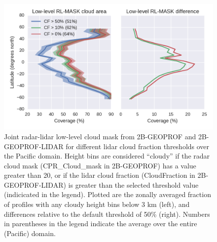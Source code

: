 \begin{figure}[htbp]
\centering
\includegraphics{graphics/misr_rlmask_test.pdf}
\caption{\label{fig:misr_rlmask_test}Joint radar-lidar low-level cloud
mask from 2B-GEOPROF and 2B-GEOPROF-LIDAR for different lidar cloud
fraction thresholds over the Pacific domain. Height bins are considered
``cloudy'' if the radar cloud mask (CPR\_Cloud\_mask in 2B-GEOPROF) has
a value greater than 20, or if the lidar cloud fraction (CloudFraction
in 2B-GEOPROF-LIDAR) is greater than the selected threshold value
(indicicated in the legend). Plotted are the zonally averaged fraction
of profiles with any cloudy height bins below 3 km (left), and
differences relative to the default threshold of 50\% (right). Numbers
in parentheses in the legend indicate the average over the entire
(Pacific) domain.}\label{fig:misrux5frlmaskux5ftest}
\end{figure}

